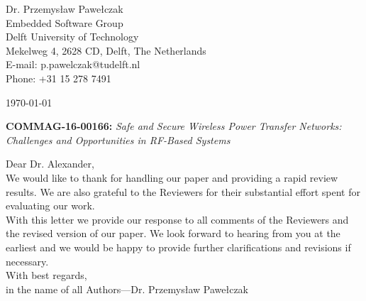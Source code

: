 \documentclass[10pt]{article}
\begin{document}
\pagestyle{myheadings}
\thispagestyle{empty}


\headsep 0.5cm

\bigskip\bigskip


\bigskip\bigskip

\begin{flushright}
Dr. Przemys{\l}aw Pawe{\l}czak \\
Embedded Software Group \\ 
Delft University of Technology \\ 
Mekelweg 4, 2628 CD, Delft, The Netherlands \\
E-mail: p.pawelczak@tudelft.nl\\
Phone: +31 15 278 7491\\
\end{flushright}

\vspace*{2cm}

\today
\medskip


\textbf{COMMAG-16-00166:} {\sl Safe and Secure Wireless Power Transfer Networks: Challenges and Opportunities in RF-Based Systems}

\bigskip

Dear Dr. Alexander,\\

We would like to thank for handling our paper and providing a rapid review results. We are also grateful to the Reviewers for their substantial effort spent for evaluating our work. \\

With this letter we provide our response to all comments of the Reviewers and the revised version of our paper. We look forward to hearing from you at the earliest and we would be happy to provide further clarifications and revisions if necessary. \\

With best regards, \\

in the name of all Authors---Dr. Przemys{\l}aw Pawe{\l}czak

\pagebreak
\end{document}
